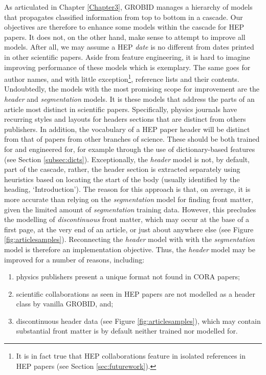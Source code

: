 As articulated in Chapter \ref{Chapter3}, GROBID manages a hierarchy of models that propagates classified information from top to bottom in a cascade. Our objectives are therefore to enhance some models within the cascade for HEP papers. It does not, on the other hand, make sense to attempt to improve all models. After all, we may assume a HEP \emph{date} is no different from dates printed in other scientific papers. Aside from feature engineering, it is hard to imagine improving performance of these models which is exemplary. The same goes for author names, and with little exception\footnote{It is in fact true that HEP collaborations feature in isolated references in HEP papers (see Section \ref{sec:futurework}).}, reference lists and their contents. Undoubtedly, the models with the most promising scope for improvement are the \emph{header} and \emph{segmentation} models. It is these models that address the parts of an article most distinct in scientific papers. Specifically, physics journals have recurring styles and layouts for headers sections that are distinct from others publishers. In addition, the vocabulary of a HEP paper header will be distinct from that of papers from other branches of science. These should be both trained for and engineered for, for example through the use of dictionary-based features (see Section \ref{subsec:dicts}). Exceptionally, the \emph{header} model is not, by default, part of the cascade, rather, the header section is extracted separately using heuristics based on locating the start of the body (usually identified by the heading, `Introduction'). The reason for this approach is that, on average, it is more accurate than relying on the \emph{segmentation} model for finding front matter, given the limited amount of \emph{segmentation} training data. However, this precludes the modelling of \emph{discontinuous} front matter, which may occur at the base of a first page, at the very end of an article, or just about anywhere else (see Figure \ref{fig:articlesamples}). Reconnecting the \emph{header} model with with the \emph{segmentation} model is therefore an implementation objective. Thus, the \emph{header} model may be improved for a number of reasons, including:

\begin{enumerate}
\item physics publishers present a unique format not found in CORA papers;
\item scientific collaborations as seen in HEP papers are not modelled as a header class by vanilla GROBID, and;
\item discontinuous header data (see Figure \ref{fig:articlesamples}), which may contain substantial front matter is by default neither trained nor modelled for.
\end{enumerate}

